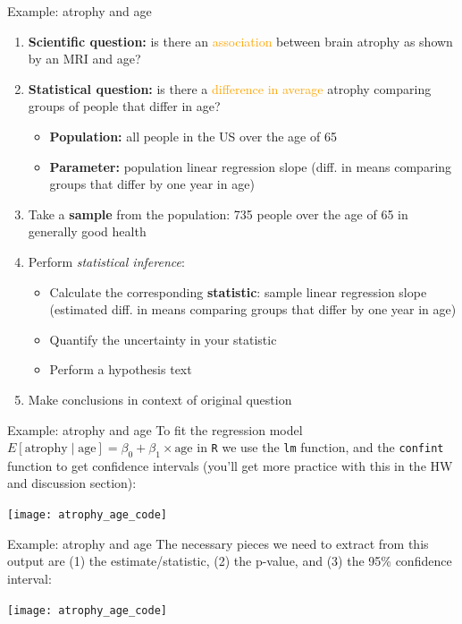 \documentclass[10pt,t]{beamer}
\begin{document}
\begin{frame}{Example: atrophy and age}
\begin{enumerate}
	\item \textbf{Scientific question:} is there an \textcolor{orange}{association} between brain atrophy as shown by an MRI and age?
	\item \textbf{Statistical question:} is there a \textcolor{orange}{difference in average} atrophy comparing groups of people that differ in age? \pause
	\begin{itemize}
		\item \textbf{Population:} all people in the US over the age of 65
		\item \textbf{Parameter:} population linear regression slope (diff. in means comparing groups that differ by one year in age) \pause
	\end{itemize}
	\item Take a \textbf{sample} from the population: 735 people over the age of 65 in generally good health \pause
	\item Perform \textit{statistical inference}:
	\begin{itemize}
		\item Calculate the corresponding \textbf{statistic}: sample linear regression slope (estimated diff. in means comparing groups that differ by one year in age)\pause
		\item Quantify the uncertainty in your statistic
		\item Perform a hypothesis text
	\end{itemize} \pause
	\item Make conclusions in context of original question
\end{enumerate}
\end{frame}

\begin{frame}{Example: atrophy and age}
To fit the regression model $E[\text{atrophy} \mid \text{age}] = \beta_0 + \beta_1 \times \text{age}$ in \texttt{R} we use the \texttt{lm} function, and the \texttt{confint} function to get confidence intervals (you'll get more practice with this in the HW and discussion section):

\vspace{0.15cm}

\centering \texttt{[image: atrophy\_age\_code]}

\end{frame}

\begin{frame}{Example: atrophy and age}
The necessary pieces we need to extract from this output are (1) the estimate/statistic, (2) the p-value, and (3) the 95\% confidence interval:

\vspace{0.15cm}

\centering \texttt{[image: atrophy\_age\_code]}

\end{frame}
\end{document}
